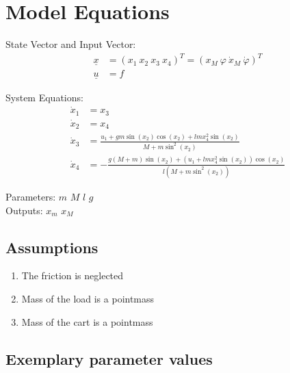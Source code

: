 \documentclass[10pt,a4paper]{article}
\begin{document}

	\section{Model Equations} %

	State Vector and Input Vector:
	\begin{align*}
		\underline{x} &= (x_1 \ x_2 \ x_3 \ x_4)^T = (x_M\ \varphi\ \dot{x}_M \ \dot{\varphi})^T\\
		\underline{u} &= f
	\end{align*}

	\noindent System Equations:
	\begin{subequations}
	\begin{align}
		\dot{x}_1 &= x_3 \\
		\dot{x}_2 &= x_4 \\
		\dot{x}_3 &=   \frac{u_1 + gm\sin(x_2)\cos(x_2) + lmx_4^2\sin(x_2)}{M + m\sin^2(x_2)} \\
		\dot{x}_4 &= - \frac{g(M + m)\sin(x_2) + (u_1 + lmx_4^2\sin(x_2))\cos(x_2)}{l(M + m\sin^2(x_2))}
	\end{align}
	\end{subequations}

	\noindent
	Parameters: $m$ $M$ $l$ $g$ %
	\\
	Outputs: $x_m$ $x_M$ %


	\subsection{Assumptions} %
		\begin{enumerate} %
			\item The friction is neglected
			\item Mass of the load is a pointmass
			\item Mass of the cart is a pointmass
		\end{enumerate}


	\subsection{Exemplary parameter values}
	
\end{document}

